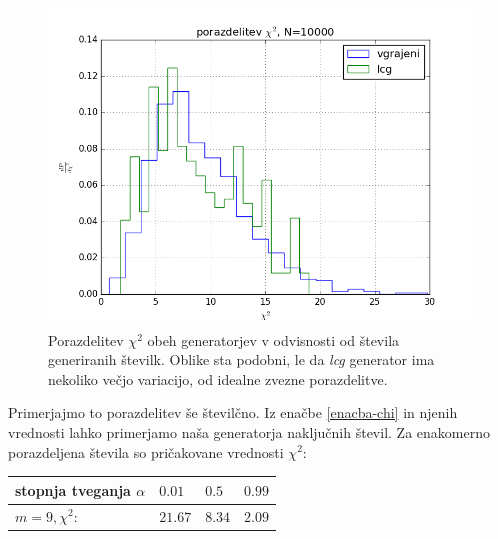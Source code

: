\documentclass[slovene,11pt,a4paper]{article}
\numberwithin{equation}{section} %
\numberwithin{figure}{section} %
\numberwithin{table}{section} %
\begin{document}
\begin{figure}[h]
\begin{minipage}{0.4\textwidth}
\includegraphics[scale=0.4]{slike/potazdelitev_chi_N_10000.png}
\end{minipage}\hfill

\caption{Porazdelitev $\chi^2$ obeh generatorjev v odvisnosti od števila generiranih številk. Oblike sta podobni, le da \textit{lcg} generator ima nekoliko večjo variacijo, od idealne zvezne porazdelitve. }
\end{figure}
Primerjajmo to porazdelitev še številčno. Iz enačbe \ref{enacba-chi} in njenih vrednosti lahko primerjamo naša generatorja naključnih števil. Za enakomerno porazdeljena števila so pričakovane vrednosti $\chi^2$:

\begin{table}[!h]
\begin{center}
\begin{tabular}{|l|l|l|l|}
\hline
stopnja tveganja $\alpha$ & $0.01$ & $0.5$ & $0.99$ \\ \hline
$m=9, \chi^2:$ & $21.67$ & $8.34$ & $2.09$ \\ \hline
\end{tabular}
\end{center}
\end{table}
\end{document}
